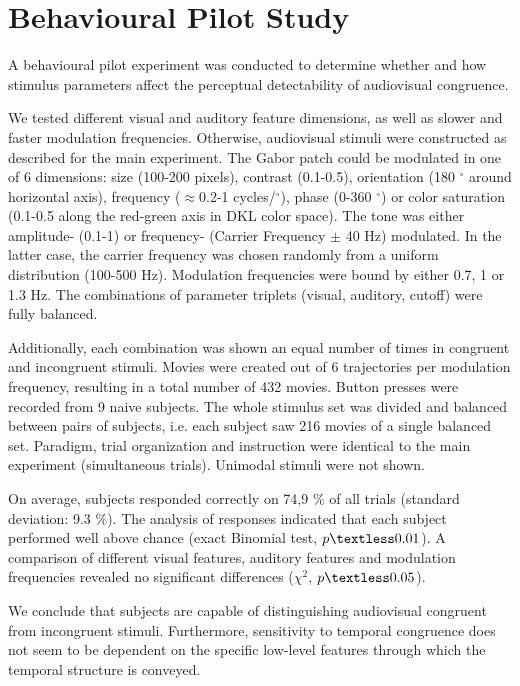 
\section{Behavioural Pilot Study} 

\label{app_eeg} 



A behavioural pilot experiment was conducted to determine whether and how
stimulus parameters affect the perceptual detectability of audiovisual
congruence. 



We tested different visual and auditory feature dimensions, as well as
slower and faster modulation frequencies. Otherwise, audiovisual stimuli
were constructed as described for the main experiment. The Gabor patch
could be modulated in one of 6 dimensions: size (100-200 pixels), contrast
(0.1-0.5), orientation (180 $^{\circ}$ around horizontal axis), frequency
($\approx$0.2-1 cycles/$^{\circ}$), phase (0-360 $^{\circ}$) or color
saturation (0.1-0.5 along the red-green axis in DKL color space). The tone
was either amplitude- (0.1-1) or frequency- (Carrier Frequency $\pm$ 40 Hz)
modulated.  In the latter case, the carrier frequency was chosen randomly
from a uniform distribution (100-500 Hz). Modulation frequencies were bound
by either 0.7, 1 or 1.3 Hz. The combinations of parameter triplets (visual,
auditory, cutoff) were fully balanced. 

Additionally, each combination was shown an equal number of times in
congruent and incongruent stimuli. Movies were created out of 6
trajectories per modulation frequency, resulting in a total number of 432
movies.  Button presses were recorded from 9 naive subjects.  The whole
stimulus set was divided and balanced between pairs of subjects, i.e. each
subject saw 216 movies of a single balanced set. Paradigm, trial
organization and instruction were identical to the main experiment
(simultaneous trials). Unimodal stimuli were not shown. 



On average, subjects responded correctly on 74,9 \% of all trials (standard
deviation: 9.3 \%). The analysis of responses indicated that each subject
performed well above chance (exact Binomial test, $p \textless 0.01$). A
comparison of different visual features, auditory features and modulation
frequencies revealed no significant differences ($\chi^{2}$, $p \textless
0.05$).



We conclude that subjects are capable of distinguishing audiovisual
congruent from incongruent stimuli. Furthermore, sensitivity to temporal
congruence does not seem to be dependent on the specific low-level features
through which the temporal structure is conveyed.


